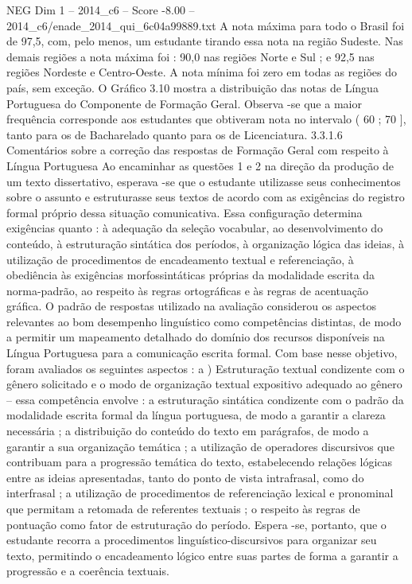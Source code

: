 \begin{textsample}{NEG Dim 1 – 2014\_c6 – Score -8.00 – 2014\_c6/enade\_2014\_qui\_6c04a99889.txt}
A nota máxima para todo o Brasil foi de 97,5, com, pelo menos, um estudante tirando essa nota na região Sudeste.
Nas demais regiões a nota máxima foi : 90,0 nas regiões Norte e Sul ; e 92,5 nas regiões Nordeste e Centro-Oeste.
A nota mínima foi zero em todas as regiões do país, sem exceção.
O Gráfico 3.10 mostra a distribuição das notas de Língua Portuguesa do Componente de Formação Geral.
Observa -se que a maior frequência corresponde aos estudantes que obtiveram nota no intervalo ( 60 ; 70 ], tanto para os de Bacharelado quanto para os de Licenciatura. 3.3.1.6 Comentários sobre a correção das respostas de Formação Geral com respeito à Língua Portuguesa Ao encaminhar as questões 1 e 2 na direção da produção de um texto dissertativo, esperava -se que o estudante utilizasse seus conhecimentos sobre o assunto e estruturasse seus textos de acordo com as exigências do registro formal próprio dessa situação comunicativa.
Essa configuração determina exigências quanto : à adequação da seleção vocabular, ao desenvolvimento do conteúdo, à estruturação sintática dos períodos, à organização lógica das ideias, à utilização de procedimentos de encadeamento textual e referenciação, à obediência às exigências morfossintáticas próprias da modalidade escrita da norma-padrão, ao respeito às regras ortográficas e às regras de acentuação gráfica.
O padrão de respostas utilizado na avaliação considerou os aspectos relevantes ao bom desempenho linguístico como competências distintas, de modo a permitir um mapeamento detalhado do domínio dos recursos disponíveis na Língua Portuguesa para a comunicação escrita formal.
Com base nesse objetivo, foram avaliados os seguintes aspectos : a ) Estruturação textual condizente com o gênero solicitado e o modo de organização textual expositivo adequado ao gênero – essa competência envolve : a estruturação sintática condizente com o padrão da modalidade escrita formal da língua portuguesa, de modo a garantir a clareza necessária ; a distribuição do conteúdo do texto em parágrafos, de modo a garantir a sua organização temática ; a utilização de operadores discursivos que contribuam para a progressão temática do texto, estabelecendo relações lógicas entre as ideias apresentadas, tanto do ponto de vista intrafrasal, como do interfrasal ; a utilização de procedimentos de referenciação lexical e pronominal que permitam a retomada de referentes textuais ; o respeito às regras de pontuação como fator de estruturação do período.
Espera -se, portanto, que o estudante recorra a procedimentos linguístico-discursivos para organizar seu texto, permitindo o encadeamento lógico entre suas partes de forma a garantir a progressão e a coerência textuais.

\end{textsample}
